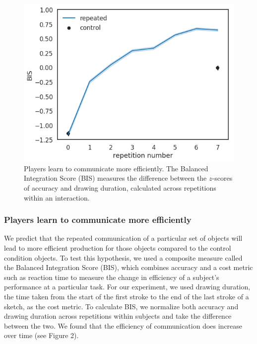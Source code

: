 \documentclass[10pt,letterpaper]{article}
\begin{document}
\begin{figure}
\includegraphics[width=\linewidth]{fig_2.png}
\caption{Players learn to communicate more efficiently. The Balanced Integration Score (BIS) measures the difference between the $z$-scores of accuracy and drawing duration, calculated across repetitions within an interaction.} \label{fig:1a}
\end{figure}

\subsubsection{Players learn to communicate more efficiently} We predict that the repeated communication of a particular set of objects will lead to more efficient production for those objects compared to the control condition objects. To test this hypothesis, we used a composite measure called the Balanced Integration Score (BIS), which combines accuracy and a cost metric such as reaction time to measure the change in efficiency of a subject's performance at a particular task. For our experiment, we used drawing duration, the time taken from the start of the first stroke to the end of the last stroke of a sketch, as the cost metric. To calculate BIS, we normalize both accuracy and drawing duration across repetitions within subjects and take the difference between the two. We found that the efficiency of communication does increase over time (see Figure 2). 
\end{document}
